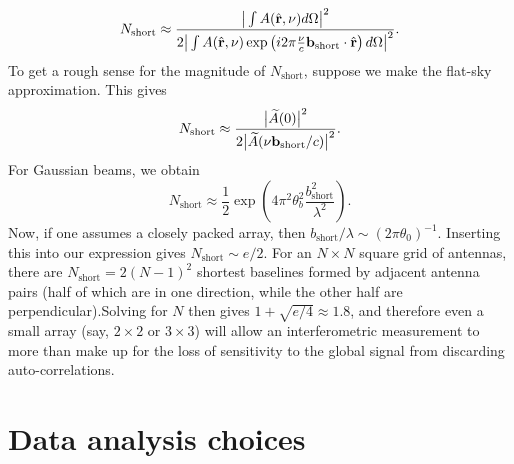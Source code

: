 \documentclass[twocolumn,apj,numberedappendix]{emulateapj}
\newcommand{\rhat}{\hat{\mathbf{r}}}
\newcommand{\acl}[1]{{\color{red} \textbf{[ACL:  #1]}}}
\newcommand{\mep}[1]{{\color{applegreen} \textbf{[MEP:  #1]}}}
\begin{document}
\begin{equation}
N_\textrm{short} \approx  \frac{\big{|} \int  A(\rhat, \nu) d\Omega \big{|}^2}{  2\big{|} \int  A(\rhat, \nu) \exp\left(i 2\pi \frac{\nu }{c}\mathbf{b}_\textrm{short} \cdot \rhat \right)d\Omega \big{|}^2}.
\end{equation}
To get a rough sense for the magnitude of $N_\textrm{short}$, suppose we make the flat-sky approximation. This gives
\begin{equation}
N_\textrm{short} \approx \frac{\big{|} \widetilde{A}(0)\big{|}^2}{2 \big{|} \widetilde{A}(\nu \mathbf{b}_\textrm{short} / c)\big{|}^2}.
\end{equation}
For Gaussian beams, we obtain
\begin{equation}
N_\textrm{short} \approx \frac{1}{2} \exp \left( 4 \pi^2 \theta_b^2 \frac{b_\textrm{short}^2}{\lambda^2} \right).
\end{equation}
Now, if one assumes a closely packed array, then $b_\textrm{short}/ \lambda \sim (2\pi \theta_0)^{-1}$. Inserting this into our expression gives $N_\textrm{short} \sim e / 2$. For an $N \times N$ square grid of antennas, there are $N_\textrm{short} = 2(N-1)^2$ shortest baselines formed by adjacent antenna pairs (half of which are in one direction, while the other half are perpendicular).Solving for $N$ then gives $1 + \sqrt{e/4} \approx 1.8$, and therefore even a small array (say, $2\times 2$ or $3\times 3$) will allow an interferometric measurement to more than make up for the loss of sensitivity to the global signal from discarding auto-correlations.
%


\section{Data analysis choices}
\label{sec:MathForm}
\end{document}
